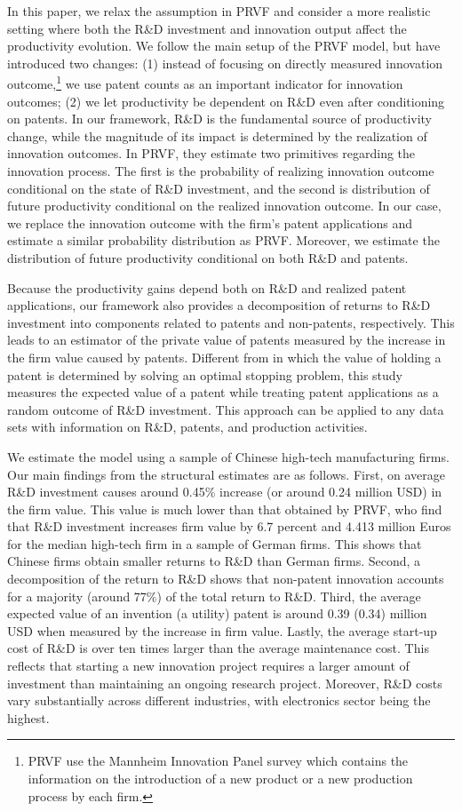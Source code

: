 \documentclass[English]{article}
\begin{document}
In this paper, we relax the assumption in PRVF and consider a more realistic setting where both the R\&D investment and innovation output affect the productivity evolution. We follow the main setup of the PRVF model, but have introduced two changes: (1) instead of focusing on directly measured innovation outcome,\footnote{PRVF use the Mannheim Innovation Panel survey which contains the information on the introduction of a new product or a new production process by each firm.} we use patent counts as an important indicator for innovation outcomes; (2) we let productivity be dependent on R\&D even after conditioning on patents. In our framework, R\&D is the fundamental source of productivity change, while the magnitude of its impact is determined by the realization of innovation outcomes. In PRVF, they estimate two primitives regarding the innovation process. The first is the probability of realizing innovation outcome conditional on the state of R\&D investment, and the second is distribution of future productivity conditional on the realized innovation outcome. In our case, we replace the innovation outcome with the firm's patent applications and estimate a similar probability distribution as PRVF.  Moreover, we estimate the distribution of future productivity conditional on both R\&D and patents.

Because the productivity gains depend both on R\&D and realized patent applications, our framework also provides a decomposition of returns to R\&D investment into components related to patents and non-patents, respectively. This leads to an estimator of the private value of patents measured by the increase in the firm value caused by patents. Different from \citet{pakes1986} in which the value of holding a patent is determined by solving an optimal stopping problem, this study measures the expected value of a patent while treating patent applications as a random outcome of R\&D investment. This approach can be applied to any data sets with information on R\&D, patents, and production activities.

We estimate the model using a sample of Chinese high-tech manufacturing firms. Our main findings from the structural estimates are as follows. First, on average R\&D investment causes around 0.45\% increase (or around 0.24 million USD) in the firm value. This value is much lower than that obtained by PRVF, who find that R\&D investment increases firm value by 6.7 percent and 4.413 million Euros for the median high-tech firm in a sample of German firms. This shows that Chinese firms obtain smaller returns to R\&D than German firms. Second, a decomposition of the return to R\&D shows that non-patent innovation accounts for a majority (around 77\%) of the total return to R\&D. Third, the average expected value of an invention (a utility) patent is around 0.39 (0.34) million USD when measured by the increase in firm value. Lastly, the average start-up cost of R\&D is over ten times larger than the average maintenance cost. This reflects that starting a new innovation project requires a larger amount of investment than maintaining an ongoing research project. Moreover, R\&D costs vary substantially across different industries, with electronics sector being the highest.
\end{document}
